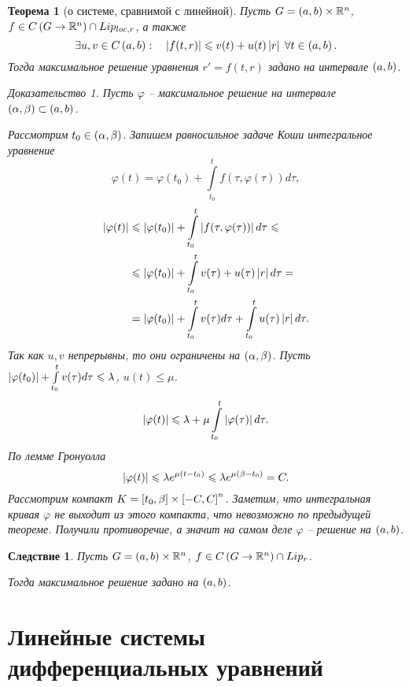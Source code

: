 \documentclass[a5paper, 10pt]{article}
\theoremstyle{definition}
\theoremstyle{plain}
\newtheorem{Th}{Теорема}
\newtheorem{Cor}{Следствие}
\theoremstyle{remark}
\newtheorem*{Proof}{Доказательство}
\begin{document}
	\begin{Th}[о системе, сравнимой с линейной]
		Пусть $G=\left(a,b\right) \times \mathbb{R}^n$, $f\in C\left(G\rightarrow \mathbb{R}^n\right)\cap Lip_{loc, r}$, а также 
		\[
		\exists u,v \in C\left(a,b\right): \quad \left|f(t,r)\right| \leqslant v(t) + u(t) \left|r\right| \; \forall t\in \left(a,b\right).
		\]
		Тогда максимальное решение уравнения $r' = f(t,r)$ задано на интервале $\left(a,b\right)$.
		\begin{Proof}
			Пусть $\varphi$ -- максимальное решение на интервале $\left(\alpha, \beta\right) \subset \left(a,b\right)$. 
			
			Рассмотрим $t_0 \in \left(\alpha, \beta\right)$. Запишем равносильное задаче Коши интегральное уравнение
			\[
			\varphi(t) = \varphi(t_0) + \int\limits_{t_0}^t f(\tau, \varphi(\tau)) d\tau, 
			\]
			\[
			\begin{split}
			\left|\varphi(t)\right| &\leqslant \left|\varphi(t_0)\right| + \int\limits_{t_0}^t \left|f(\tau, \varphi(\tau))\right| d\tau \leqslant \\
			&\leqslant \left|\varphi(t_0)\right| + \int\limits_{t_0}^t v(\tau)+u(\tau) \left|r\right| d\tau =\\
			&= \left|\varphi(t_0)\right| + \int\limits_{t_0}^t v(\tau) d\tau+ \int\limits_{t_0}^t u(\tau) \left|r\right| d\tau.
			\end{split}
			\]
			Так как $u,v$ непрерывны, то они ограничены на $\left(\alpha, \beta\right)$. Пусть $\left|\varphi(t_0)\right| + \int\limits_{t_0}^t v(\tau) d\tau \leqslant \lambda$, $u(t) \leqslant \mu$.
			\[
			\left|\varphi(t)\right| \leqslant \lambda + \mu \int\limits_{t_0}^t \left|\varphi(\tau)\right| d\tau.
			\]
			По лемме Гронуолла
			\[
			\left|\varphi(t)\right| \leqslant \lambda e^{\mu(t-t_0)} \leqslant \lambda e^{\mu(\beta-t_0)} = C.
			\]
			Рассмотрим компакт $K = \left[t_0, \beta\right] \times \left[-C, C\right]^n$.
			Заметим, что интегральная кривая $\varphi$ не выходит из этого компакта, что невозможно по предыдущей теореме. Получили противоречие, а значит на самом деле $\varphi$ -- решение на $\left(a,b\right)$.
		\end{Proof}
	\end{Th}

	\begin{Cor}
		Пусть $G = \left(a,b\right) \times \mathbb{R}^n$, $f\in C\left(G\rightarrow \mathbb{R}^n\right) \cap Lip_r$.
		
		Тогда максимальное решение задано на $\left(a,b\right)$.
	\end{Cor}
	
	\part{Линейные системы дифференциальных уравнений}
	
\end{document}
